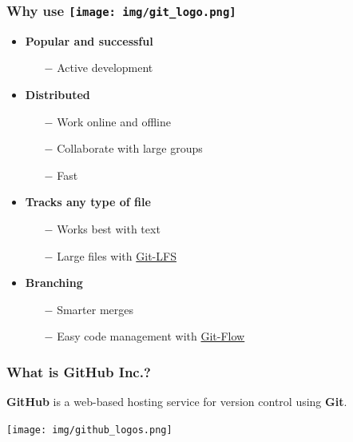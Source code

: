 \documentclass[svgnames]{beamer}
\begin{document}
\begin{frame}
    \frametitle{Why use \texttt{[image: img/git\_logo.png]}}
    \begin{itemize}
        \item{ \textbf{Popular and successful}
            \begin{itemize}
                \item[$-$]{Active development}
            \end{itemize}
            }

        \item { \textbf{Distributed}
            \begin{itemize}
                \item[$-$]{Work online and offline}
                \item[$-$]{Collaborate with large groups}
                \item[$-$]{Fast}
            \end{itemize}
		} 
 
        \item{ \textbf{Tracks any type of file}
            \begin{itemize}
                \item[$-$]{Works best with text}
                \item[$-$]{Large files with \href{https://git-lfs.github.com/}{Git-LFS}}
            \end{itemize}
            }

        \item { \textbf{Branching}
            \begin{itemize}
                \item[$-$]{Smarter merges}
                \item[$-$]{Easy code management with \href{https://git-flow.readthedocs.io/fr/latest/index.html}{Git-Flow}}
            \end{itemize}
        }
    \end{itemize}
\end{frame}

\begin{frame}
    \frametitle{What is GitHub Inc.?}

    \begin{center}
        \textbf{GitHub} is a web-based hosting service for version control using \textbf{Git}.
    \end{center}

    \begin{center}
        \texttt{[image: img/github\_logos.png]}
    \end{center}
\end{frame}
\end{document}

